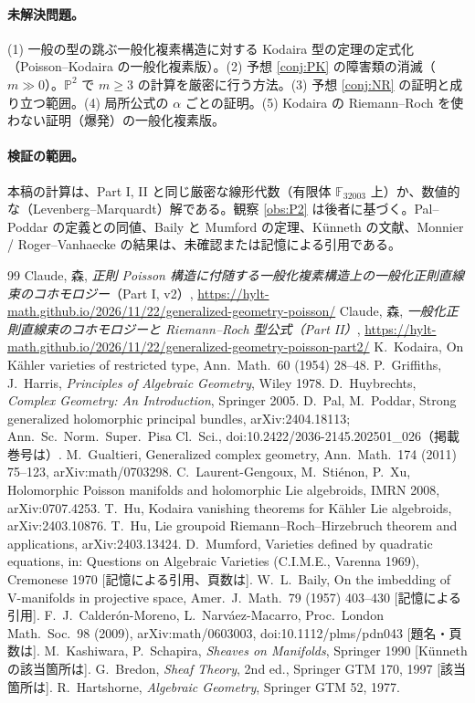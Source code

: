 \paragraph{未解決問題。}(1) 一般の型の跳ぶ一般化複素構造に対する Kodaira 型の定理の定式化（Poisson--Kodaira の一般化複素版）。(2) 予想 \ref{conj:PK} の障害類の消滅（$m\gg0$）。$\mathbb P^2$ で $m\ge3$ の計算を厳密に行う方法。(3) 予想 \ref{conj:NR} の証明と成り立つ範囲。(4) 局所公式の $\alpha$ ごとの証明。(5) Kodaira の Riemann--Roch を使わない証明（爆発）の一般化複素版。\par
\paragraph{検証の範囲。}本稿の計算は、Part I, II と同じ厳密な線形代数（有限体 $\mathbb F_{32003}$ 上）か、数値的な（Levenberg--Marquardt）解である。観察 \ref{obs:P2} は後者に基づく。Pal--Poddar の定義との同値、Baily と Mumford の定理、Künneth の文献、Monnier / Roger--Vanhaecke の結果は、未確認または記憶による引用である。

\begin{thebibliography}{99}\small
{} Claude, 森, \emph{正則 Poisson 構造に付随する一般化複素構造上の一般化正則直線束のコホモロジー}（Part I, v2）, \url{https://hylt-math.github.io/2026/11/22/generalized-geometry-poisson/}
 Claude, 森, \emph{一般化正則直線束のコホモロジーと Riemann--Roch 型公式（Part II）}, \url{https://hylt-math.github.io/2026/11/22/generalized-geometry-poisson-part2/}
 K.\ Kodaira, On K\"ahler varieties of restricted type, Ann.\ Math.\ 60 (1954) 28--48.
 P.\ Griffiths, J.\ Harris, \emph{Principles of Algebraic Geometry}, Wiley 1978.
 D.\ Huybrechts, \emph{Complex Geometry: An Introduction}, Springer 2005.
 D.\ Pal, M.\ Poddar, Strong generalized holomorphic principal bundles, arXiv:2404.18113; Ann.\ Sc.\ Norm.\ Super.\ Pisa Cl.\ Sci., doi:10.2422/2036-2145.202501\_026（掲載巻号は\tQ）.
 M.\ Gualtieri, Generalized complex geometry, Ann.\ Math.\ 174 (2011) 75--123, arXiv:math/0703298.
 C.\ Laurent-Gengoux, M.\ Sti\'enon, P.\ Xu, Holomorphic Poisson manifolds and holomorphic Lie algebroids, IMRN 2008, arXiv:0707.4253.
 T.\ Hu, Kodaira vanishing theorems for K\"ahler Lie algebroids, arXiv:2403.10876.
 T.\ Hu, Lie groupoid Riemann--Roch--Hirzebruch theorem and applications, arXiv:2403.13424.
 D.\ Mumford, Varieties defined by quadratic equations, in: Questions on Algebraic Varieties (C.I.M.E., Varenna 1969), Cremonese 1970 [記憶による引用、頁数は\tQ].
 W.\ L.\ Baily, On the imbedding of V-manifolds in projective space, Amer.\ J.\ Math.\ 79 (1957) 403--430 [記憶による引用\tQ].
 F.\ J.\ Calder\'on-Moreno, L.\ Narv\'aez-Macarro, Proc.\ London Math.\ Soc.\ 98 (2009), arXiv:math/0603003, doi:10.1112/plms/pdn043 [題名・頁数は\tQ].
 M.\ Kashiwara, P.\ Schapira, \emph{Sheaves on Manifolds}, Springer 1990 [Künneth の該当箇所は\tQ].
 G.\ Bredon, \emph{Sheaf Theory}, 2nd ed., Springer GTM 170, 1997 [該当箇所は\tQ].
 R.\ Hartshorne, \emph{Algebraic Geometry}, Springer GTM 52, 1977.
\end{thebibliography}
